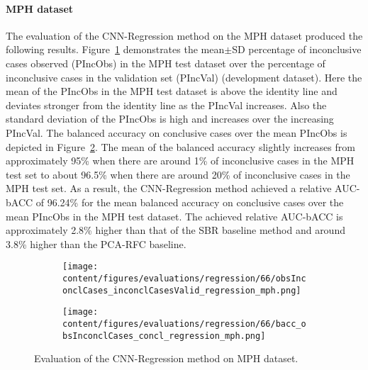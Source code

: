 
\paragraph{MPH dataset}

The evaluation of the CNN-Regression method on the MPH dataset produced the following results.
Figure~\ref{fig:obsInconclCases_inconclCasesValid_regression_mph} demonstrates
the mean$\pm$SD percentage of inconclusive cases observed (PIncObs) in the MPH test dataset 
over the percentage of inconclusive cases in the validation set (PIncVal) (development dataset).
Here the mean of the PIncObs in the MPH test dataset is above the identity line 
and deviates stronger from the identity line as the PIncVal increases.
Also the standard deviation of the PIncObs is high and increases over the increasing PIncVal.
The balanced accuracy on conclusive cases over the mean PIncObs 
is depicted in Figure~\ref{fig:bacc_obsInconclCases_concl_regression_mph}.
The mean of the balanced accuracy slightly increases from approximately 95\% 
when there are around 1\% of inconclusive cases in the MPH test set to about 96.5\% 
when there are around 20\% of inconclusive cases in the MPH test set.
As a result, the CNN-Regression method achieved a relative AUC-bACC of 96.24\% for the mean balanced accuracy on conclusive cases 
over the mean PIncObs in the MPH test dataset.
The achieved relative AUC-bACC is approximately 2.8\% higher than that of the SBR baseline method 
and around 3.8\% higher than the PCA-RFC baseline.


\begin{figure}[ht]
  \begin{subfigure}{0.49\textwidth}
    \centering
    \texttt{[image: content/figures/evaluations/regression/66/obsInconclCases\_inconclCasesValid\_regression\_mph.png]}
    \label{fig:obsInconclCases_inconclCasesValid_regression_mph}
  \end{subfigure}
  \hfill
  \begin{subfigure}{0.49\textwidth}
    \centering
    \texttt{[image: content/figures/evaluations/regression/66/bacc\_obsInconclCases\_concl\_regression\_mph.png]}
    \label{fig:bacc_obsInconclCases_concl_regression_mph}
  \end{subfigure}
  \caption{Evaluation of the CNN-Regression method on MPH dataset.}
  \label{fig:perf_regression_mph}
\end{figure}


